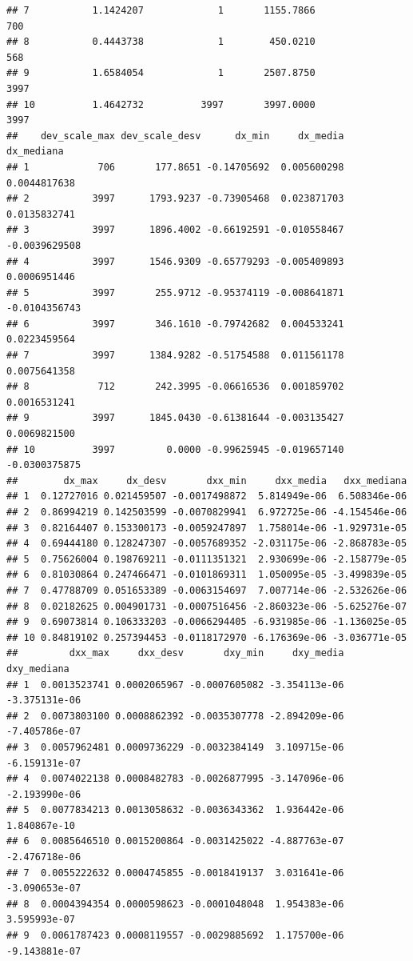 \documentclass[11pt,]{article}
\begin{document}
\begin{verbatim}
## 7           1.1424207             1       1155.7866               700
## 8           0.4443738             1        450.0210               568
## 9           1.6584054             1       2507.8750              3997
## 10          1.4642732          3997       3997.0000              3997
##    dev_scale_max dev_scale_desv      dx_min     dx_media    dx_mediana
## 1            706       177.8651 -0.14705692  0.005600298  0.0044817638
## 2           3997      1793.9237 -0.73905468  0.023871703  0.0135832741
## 3           3997      1896.4002 -0.66192591 -0.010558467 -0.0039629508
## 4           3997      1546.9309 -0.65779293 -0.005409893  0.0006951446
## 5           3997       255.9712 -0.95374119 -0.008641871 -0.0104356743
## 6           3997       346.1610 -0.79742682  0.004533241  0.0223459564
## 7           3997      1384.9282 -0.51754588  0.011561178  0.0075641358
## 8            712       242.3995 -0.06616536  0.001859702  0.0016531241
## 9           3997      1845.0430 -0.61381644 -0.003135427  0.0069821500
## 10          3997         0.0000 -0.99625945 -0.019657140 -0.0300375875
##        dx_max     dx_desv       dxx_min     dxx_media   dxx_mediana
## 1  0.12727016 0.021459507 -0.0017498872  5.814949e-06  6.508346e-06
## 2  0.86994219 0.142503599 -0.0070829941  6.972725e-06 -4.154546e-06
## 3  0.82164407 0.153300173 -0.0059247897  1.758014e-06 -1.929731e-05
## 4  0.69444180 0.128247307 -0.0057689352 -2.031175e-06 -2.868783e-05
## 5  0.75626004 0.198769211 -0.0111351321  2.930699e-06 -2.158779e-05
## 6  0.81030864 0.247466471 -0.0101869311  1.050095e-05 -3.499839e-05
## 7  0.47788709 0.051653389 -0.0063154697  7.007714e-06 -2.532626e-06
## 8  0.02182625 0.004901731 -0.0007516456 -2.860323e-06 -5.625276e-07
## 9  0.69073814 0.106333203 -0.0066294405 -6.931985e-06 -1.136025e-05
## 10 0.84819102 0.257394453 -0.0118172970 -6.176369e-06 -3.036771e-05
##         dxx_max     dxx_desv       dxy_min     dxy_media   dxy_mediana
## 1  0.0013523741 0.0002065967 -0.0007605082 -3.354113e-06 -3.375131e-06
## 2  0.0073803100 0.0008862392 -0.0035307778 -2.894209e-06 -7.405786e-07
## 3  0.0057962481 0.0009736229 -0.0032384149  3.109715e-06 -6.159131e-07
## 4  0.0074022138 0.0008482783 -0.0026877995 -3.147096e-06 -2.193990e-06
## 5  0.0077834213 0.0013058632 -0.0036343362  1.936442e-06  1.840867e-10
## 6  0.0085646510 0.0015200864 -0.0031425022 -4.887763e-07 -2.476718e-06
## 7  0.0055222632 0.0004745855 -0.0018419137  3.031641e-06 -3.090653e-07
## 8  0.0004394354 0.0000598623 -0.0001048048  1.954383e-06  3.595993e-07
## 9  0.0061787423 0.0008119557 -0.0029885692  1.175700e-06 -9.143881e-07

\end{verbatim}
\end{document}
